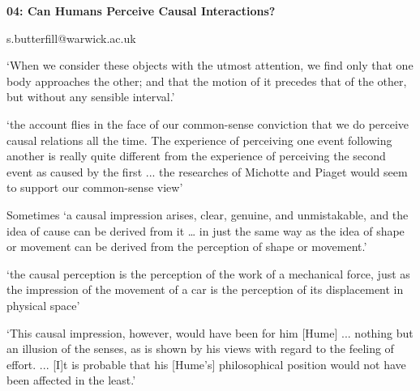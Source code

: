 \documentclass[12pt]{extarticle}
\date{}
\makeatletter
\def \ititle {Philosophical Psychology}
\def \iemail{s.butterfill@warwick.ac.uk}
\makeatother
\begin{document}
\begin{multicols*}{3}

\setlength\footnotesep{1em}











\def \ititle {04: Can Humans Perceive Causal Interactions?}

\begin{center}

{\Large

\textbf{\ititle}

}



\iemail %

\end{center}


‘When we consider these objects with the utmost attention, we find only
that one body approaches the other; and that the motion of it precedes
that of the other, but without any sensible interval.’ \citep[p.~77]{Hume:1739lj}

‘the account flies in the face of our common-sense conviction that we do
perceive causal relations all the time. The experience of perceiving one
event following another is really quite different from the experience of
perceiving the second event as caused by the first ... the researches of Michotte and Piaget would seem to support our
common-sense view’
\citep[pp.~114-5]{Searle:1983tx}

Sometimes ‘a causal impression arises, clear,
genuine, and unmistakable, and the idea of cause can be derived from it
… in just the same way as the idea of shape or movement can be derived
from the perception of shape or movement.’
\citep[p.~270--1]{Michotte:1946nz}

‘the causal perception is the perception of the work of a mechanical force,
just as the impression of the movement of a car is the perception of its
displacement in physical space’
\citep[p.~228]{Michotte:1946nz}

‘This causal impression, however, would have been for him [Hume] ...
nothing but an illusion of the senses, as is shown by his
views with regard to the feeling of effort. ... [I]t is probable that his
[Hume’s] philosophical position would not have been affected in the
least.’
\citep[p.~256]{Michotte:1946nz}


\end{multicols*}
\end{document}

